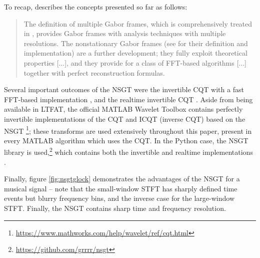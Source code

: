 \documentclass[letter,12pt]{article}
\begin{document}
To recap, \citet{adaptivecqt} describes the concepts presented so far as follows:

\begin{quote}
	The definition of multiple Gabor frames, which is comprehensively treated in \cite{doerflerphd}, provides Gabor frames with analysis techniques with multiple resolutions. The nonstationary Gabor frames (see \cite{balazs, jaillet} for their definition and implementation) are a further development; they fully exploit theoretical properties [...], and they provide for a class of FFT-based algorithms [...] together with perfect reconstruction formulas.
\end{quote}

Several important outcomes of the NSGT were the invertible CQT with a fast FFT-based implementation \cite{invertiblecqt}, and the realtime invertible CQT \cite{rtcqt}. Aside from being available in LTFAT, the official MATLAB Wavelet Toolbox contains perfectly invertible implementations of the CQT and ICQT (inverse CQT) based on the NSGT \footnote{\url{https://www.mathworks.com/help/wavelet/ref/cqt.html}}; these transforms are used extensively throughout this paper, present in every MATLAB algorithm which uses the CQT. In the Python case, the NSGT library is used,\footnote{\url{https://github.com/grrrr/nsgt}} which contains both the invertible and realtime implementations \cite{invertiblecqt, rtcqt}.

Finally, figure \ref{fig:nsgtglock} demonstrates the advantages of the NSGT for a musical signal -- note that the small-window STFT has sharply defined time events but blurry frequency bins, and the inverse case for the large-window STFT. Finally, the NSGT contains sharp time and frequency resolution.
\end{document}
